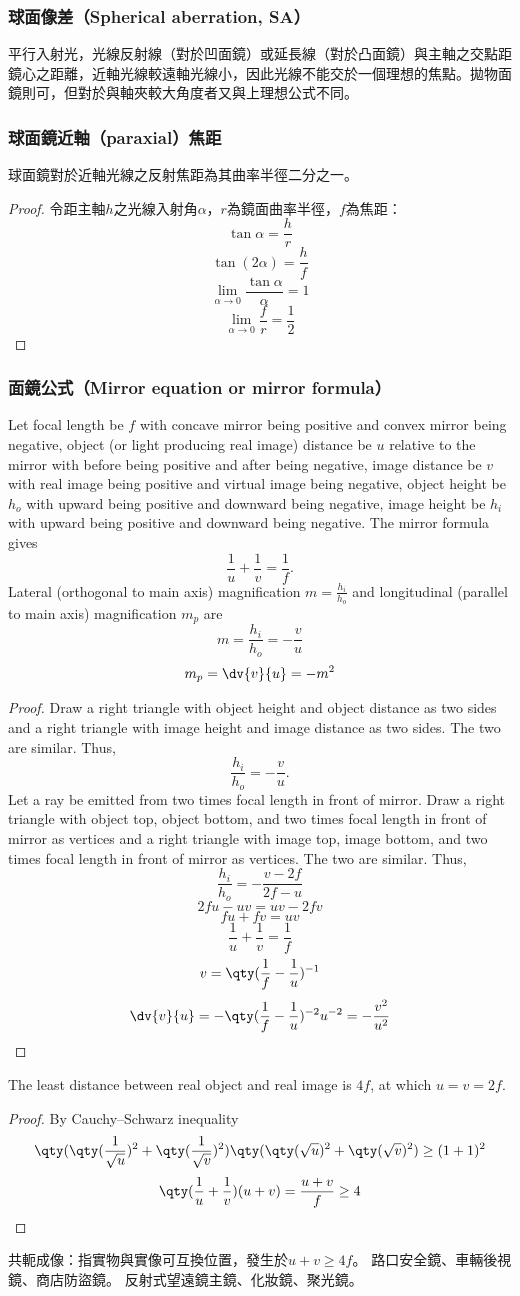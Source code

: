 \documentclass[a4paper,12pt]{report}
\begin{document}
\subsubsection{球面像差（Spherical aberration, SA）}
平行入射光，光線反射線（對於凹面鏡）或延長線（對於凸面鏡）與主軸之交點距鏡心之距離，近軸光線較遠軸光線小，因此光線不能交於一個理想的焦點。拋物面鏡則可，但對於與軸夾較大角度者又與上理想公式不同。
\subsubsection{球面鏡近軸（paraxial）焦距}
球面鏡對於近軸光線之反射焦距為其曲率半徑二分之一。
\begin{proof}
令距主軸$h$之光線入射角$\alpha$，$r$為鏡面曲率半徑，$f$為焦距：
\[\tan\alpha=\frac{h}{r}\]
\[\tan(2\alpha)=\frac{h}{f}\]
\[\lim_{\alpha\to 0}\frac{\tan\alpha}{\alpha}=1\]
\[\lim_{\alpha\to 0}\frac{f}{r}=\frac{1}{2}\]
\end{proof}
\subsubsection{面鏡公式（Mirror equation or mirror formula）}
Let focal length be $f$ with concave mirror being positive and convex mirror being negative, object (or light producing real image) distance be $u$ relative to the mirror with before being positive and after being negative, image distance be $v$ with real image being positive and virtual image being negative, object height be $h_o$ with upward being positive and downward being negative, image height be $h_i$ with upward being positive and downward being negative. The mirror formula gives
\[\frac{1}{u}+\frac{1}{v}=\frac{1}{f}.\]
Lateral (orthogonal to main axis) magnification $m=\frac{h_i}{h_o}$ and longitudinal (parallel to main axis) magnification $m_p$ are
\[m=\frac{h_i}{h_o}=-\frac{v}{u}\]
\[m_p=\dv{v}{u}=-m^2\]
\begin{proof}
Draw a right triangle with object height and object distance as two sides and a right triangle with image height and image distance as two sides. The two are similar. Thus,
\[\frac{h_i}{h_o}=-\frac{v}{u}.\]
Let a ray be emitted from two times focal length in front of mirror. Draw a right triangle with object top, object bottom, and two times focal length in front of mirror as vertices and a right triangle with image top, image bottom, and two times focal length in front of mirror as vertices. The two are similar. Thus,
\[\frac{h_i}{h_o}=-\frac{v-2f}{2f-u}\]
\[2fu-uv=uv-2fv\]
\[fu+fv=uv\]
\[\frac{1}{u}+\frac{1}{v}=\frac{1}{f}\]
\[v=\qty(\frac{1}{f}-\frac{1}{u})^{-1}\]
\[\dv{v}{u}=-\qty(\frac{1}{f}-\frac{1}{u})^{-2}u^{-2}=-\frac{v^2}{u^2}\]
\end{proof}
The least distance between real object and real image is $4f$, at which $u=v=2f$.
\begin{proof}
By Cauchy–Schwarz inequality
\[\qty(\qty(\frac{1}{\sqrt{u}})^2+\qty(\frac{1}{\sqrt{v}})^2)\qty(\qty(\sqrt{u})^2+\qty(\sqrt{v})^2)\geq (1+1)^2\]
\[\qty(\frac{1}{u}+\frac{1}{v})(u+v)=\frac{u+v}{f}\geq 4\]
\end{proof}
共軛成像：指實物與實像可互換位置，發生於$u+v\geq 4f$。
路口安全鏡、車輛後視鏡、商店防盜鏡。
反射式望遠鏡主鏡、化妝鏡、聚光鏡。
\end{document}
